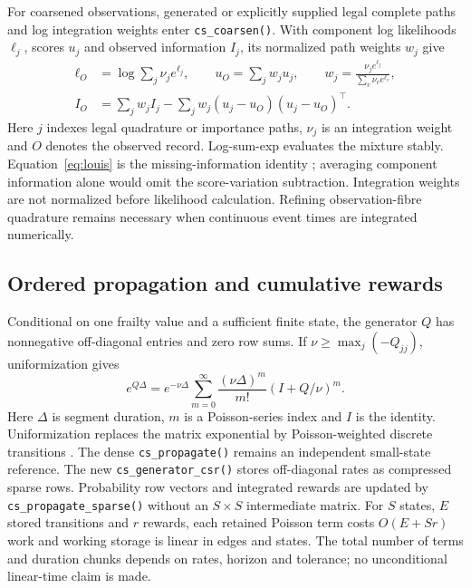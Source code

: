 \documentclass[article,nojss]{jss}
\newcommand{\code}[1]{\texttt{#1}}
\begin{document}
For coarsened observations, generated or explicitly supplied legal complete paths and log integration weights enter \code{cs\_coarsen()}. With component log likelihoods $\ell_j$, scores $u_j$ and observed information $I_j$, its normalized path weights $w_j$ give
\begin{equation}\label{eq:louis}
\begin{aligned}
\ell_O&=\log\sum_j \nu_j e^{\ell_j},\qquad
u_O=\sum_jw_ju_j,\qquad
w_j=\frac{\nu_je^{\ell_j}}{\sum_v\nu_ve^{\ell_v}},\\
I_O&=\sum_jw_jI_j-\sum_jw_j(u_j-u_O)(u_j-u_O)^\top.
\end{aligned}
\end{equation}
Here $j$ indexes legal quadrature or importance paths, $\nu_j$ is an integration weight and $O$ denotes the observed record. Log-sum-exp evaluates the mixture stably. Equation~\ref{eq:louis} is the missing-information identity \citep{Louis1982}; averaging component information alone would omit the score-variation subtraction. Integration weights are not normalized before likelihood calculation. Refining observation-fibre quadrature remains necessary when continuous event times are integrated numerically.

\subsection{Ordered propagation and cumulative rewards}
Conditional on one frailty value and a sufficient finite state, the generator $Q$ has nonnegative off-diagonal entries and zero row sums. If $\nu\geq\max_j(-Q_{jj})$, uniformization gives
\begin{equation}\label{eq:uniformization}
e^{Q\Delta}=e^{-\nu\Delta}\sum_{m=0}^{\infty}
\frac{(\nu\Delta)^m}{m!}\left(I+Q/\nu\right)^m.
\end{equation}
Here $\Delta$ is segment duration, $m$ is a Poisson-series index and $I$ is the identity. Uniformization replaces the matrix exponential by Poisson-weighted discrete transitions \citep{Rao2013}. The dense \code{cs\_propagate()} remains an independent small-state reference. The new \code{cs\_generator\_csr()} stores off-diagonal rates as compressed sparse rows. Probability row vectors and integrated rewards are updated by \code{cs\_propagate\_sparse()} without an $S\times S$ intermediate matrix. For $S$ states, $E$ stored transitions and $r$ rewards, each retained Poisson term costs $O(E+Sr)$ work and working storage is linear in edges and states. The total number of terms and duration chunks depends on rates, horizon and tolerance; no unconditional linear-time claim is made.
\end{document}
